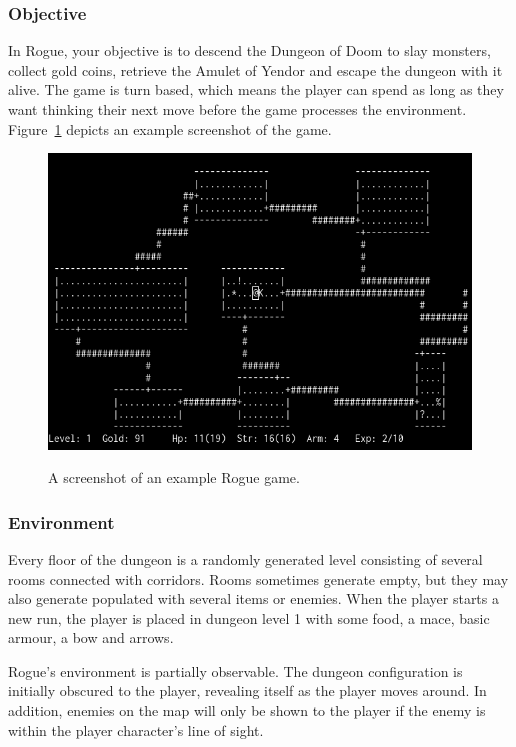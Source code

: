 \documentclass[12pt,a4paper]{article}
\begin{document}
    \subsubsection{Objective}\label{subsubsec:objective}
    In Rogue, your objective is to descend the Dungeon of Doom to slay monsters, collect gold coins, retrieve the Amulet of Yendor and escape the dungeon with it alive.
    The game is turn based, which means the player can spend as long as they want thinking their next move before the game processes the environment.
    Figure~\ref{fig:rogsc} depicts an example screenshot of the game.

    \begin{figure}[t]
        \caption{A screenshot of an example Rogue game.}
        \centering
        \includegraphics[scale=0.5]{rogue_screenshot}
        \label{fig:rogsc}
    \end{figure}

    \subsubsection{Environment}\label{subsubsec:environment}

    Every floor of the dungeon is a randomly generated level consisting of several rooms connected with corridors.
    Rooms sometimes generate empty, but they may also generate populated with several items or enemies.
    When the player starts a new run, the player is placed in dungeon level 1 with some food, a mace, basic armour, a bow and arrows.

    Rogue's environment is partially observable.
    The dungeon configuration is initially obscured to the player, revealing itself as the player moves around.
    In addition, enemies on the map will only be shown to the player if the enemy is within the player character's line of sight.
\end{document}
